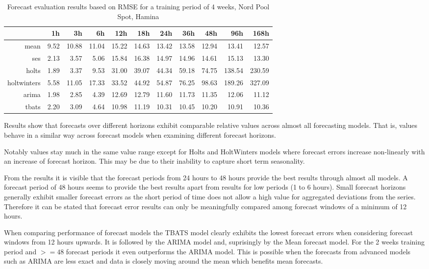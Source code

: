\begin{table}[ht]
\centering
\begin{tabular}{rrrrrrrrrrr}
  \hline
 & 1h & 3h & 6h & 12h & 18h & 24h & 36h & 48h & 96h & 168h \\ 
  \hline
mean & 9.52 & 10.88 & 11.04 & 15.22 & 14.63 & 13.42 & 13.58 & 12.94 & 13.41 & 12.57 \\ 
  ses & 2.13 & 3.57 & 5.06 & 15.84 & 16.38 & 14.97 & 14.96 & 14.61 & 15.13 & 13.30 \\ 
  holts & 1.89 & 3.37 & 9.53 & 31.00 & 39.07 & 44.34 & 59.18 & 74.75 & 138.54 & 230.59 \\ 
  holtwinters & 5.58 & 11.05 & 17.33 & 33.52 & 44.92 & 54.87 & 76.25 & 98.63 & 189.26 & 327.09 \\ 
  arima & 1.98 & 2.85 & 4.39 & 12.69 & 12.79 & 11.60 & 11.73 & 11.35 & 12.06 & 11.12 \\ 
  tbats & 2.20 & 3.09 & 4.64 & 10.98 & 11.19 & 10.31 & 10.45 & 10.20 & 10.91 & 10.36 \\ 
   \hline
\end{tabular}
\caption{Forecast evaluation results based on RMSE for a training period of 4 weeks, Nord Pool Spot, Hamina}
\label{tab:results_hamina_4weeks}
\end{table}


Results show that forecasts over different horizons exhibit comparable relative values across almost all forecasting models. That is, values behave in a similar way across forecast models when examining different forecast horizons. 

Notably values stay much in the same value range except for Holts and HoltWinters models where forecast errors increase non-linearly with an increase of forecast horizon. This may be due to their inability to capture short term seasonality. 

From the results it is visible that the forecast periods from 24 hours to 48 hours provide the best results through almost all models. A forecast period of 48 hours seems to provide the best results apart from results for low periods (1 to 6 hours). Small forecast horizons generally exhibit smaller forecast errors as the short period of time does not allow a high value for aggregated deviations from the series. Therefore it can be stated that forecast error results can only be meaningfully compared among forecast windows of a minimum of 12 hours. 

When comparing performance of forecast models the TBATS model clearly exhibits the lowest forecast errors when considering forecast windows from 12 hours upwards. It is followed by the ARIMA model and, suprisingly by the Mean forecast model. For the 2 weeks training period and $>= 48$ forecast periods it even outperforms the ARIMA model. This is possible when the forecasts from advanced models such as ARIMA are less exact and data is closely moving around the mean which benefits mean forecasts. 




